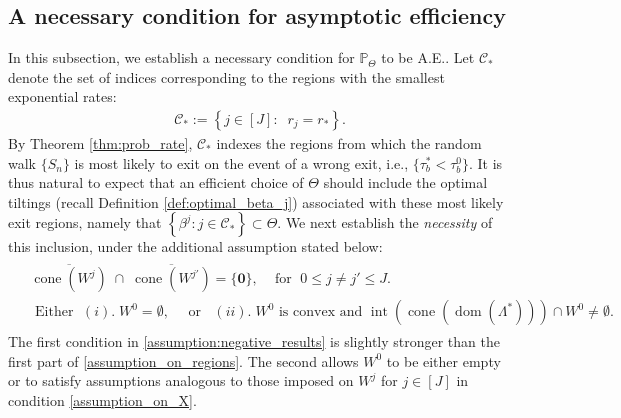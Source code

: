 \documentclass[aap,preprint]{imsart}
\newcommand{\Pro}{{\mathbb{P}}}
\theoremstyle{plain}
\theoremstyle{definition}
\begin{document}
\subsection{A necessary condition for  asymptotic efficiency}
In this subsection, we establish a necessary condition for $\Pro_{\Theta}$ to be A.E.. Let $\mathcal{C}_*$ denote the set of indices corresponding to the regions with the smallest exponential rates:
\begin{align}\label{def:C_star}
    \mathcal{C}_* := \left\{j \in [J] :\;\; r_j = r_* \right\}.
\end{align}
By Theorem \ref{thm:prob_rate}, $\mathcal{C}_*$ indexes the regions from which the random walk $\{S_n\}$ is most likely to exit on the event of a wrong exit, i.e., $\{\tau_b^* < \tau_b^0\}$. It is thus natural to expect that an efficient choice of   $\Theta$ should include 
the optimal tiltings (recall  Definition \ref{def:optimal_beta_j}) associated with these most likely exit regions, namely that $
    \left\{\beta^j : j \in \mathcal{C}_* \right\} \subset \Theta$. We next establish the \emph{necessity} of this inclusion, under the additional assumption stated below:
\begin{align}\label{assumption:negative_results}  \tag{C4}
    \begin{split}
    &  \overline{\operatorname{cone}(W^j)} \;\cap\; \overline{\operatorname{cone}(W^{j'})} = \{\mathbf{0}\}, \;\;\; \text{ for } \;0 \leq j \neq j' \leq J. \\
    & \text{ Either } \; (i). \; W^0 = \emptyset, \quad  \text{ or } \;\; (ii).\; W^0 \text{ is convex and } \operatorname{int}\left(\operatorname{cone}\left( \operatorname{dom}(\Lambda^*)\right)\right) \cap W^0 \neq \emptyset.
    \end{split}
\end{align}
The first condition in \eqref{assumption:negative_results} is slightly stronger than the first part of \eqref{assumption_on_regions}. The second %
allows $W^0$ to be either empty or to satisfy assumptions analogous to those imposed on $W^j$ for $j \in [J]$ in  condition \eqref{assumption_on_X}.


  
\end{document}
